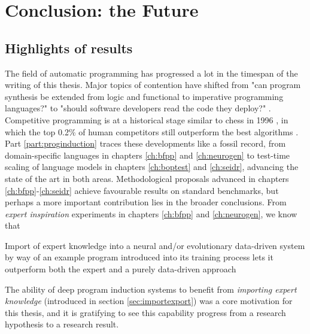 
\chapter{Conclusion: the Future}
\label{ch:conclusion}
\newcommand{\prevchap}{\fpeval{\getrefnumber{ch:conclusion} - 1}}

\section{Highlights of results}

The field of automatic programming has progressed a lot in the timespan of the writing of this thesis.
Major topics of contention have shifted from "can program synthesis be extended from logic and functional to imperative programming languages?" \cite{polikarpovaStructuringSynthesisHeapmanipulating2019} to "should software developers read the code they deploy?" \cite{andrejkarpathy[@karpathy]TheresNewKind2025}.
Competitive programming is at a historical stage similar to chess in 1996 \cite{pandolfiniKasparovDeepBlue1997}, in which the top 0.2\% of human competitors still outperform the best algorithms \cite{openaiCompetitiveProgrammingLarge2025}.
Part \ref{part:proginduction} traces these developments like a fossil record, from domain-specific languages in chapters \ref{ch:bfpp} and \ref{ch:neurogen} to test-time scaling of language models in chapters \ref{ch:boptest} and \ref{ch:seidr}, advancing the state of the art in both areas.
Methodological proposals advanced in chapters \ref{ch:bfpp}-\ref{ch:seidr} achieve favourable results on standard benchmarks, but perhaps a more important contribution lies in the broader conclusions.
From \emph{expert inspiration} experiments in chapters \ref{ch:bfpp} and \ref{ch:neurogen}, we know that

\begin{highlight}
Import of expert knowledge into a neural and/or evolutionary data-driven system by way of an example program introduced into its training process lets it outperform both the expert and a purely data-driven approach
\end{highlight}

The ability of deep program induction systems to benefit from \emph{importing expert knowledge} (introduced in section \ref{sec:importexport}) was a core motivation for this thesis, and it is gratifying to see this capability progress from a research hypothesis to a research result.

